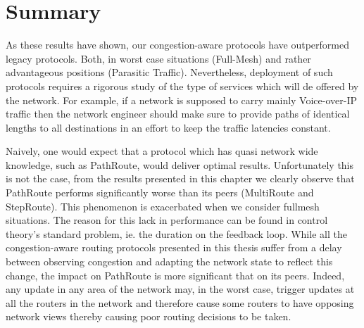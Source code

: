 \section{Summary}

As these results have shown, our congestion-aware protocols have outperformed legacy protocols. Both, in worst case situations (Full-Mesh) and rather advantageous positions (Parasitic Traffic). Nevertheless, deployment of such protocols requires a rigorous study of the type of services which will de offered by the network. For example, if a network is supposed to carry mainly Voice-over-IP traffic then the network engineer should make sure to provide paths of identical lengths to all destinations in an effort to keep the traffic latencies constant. 

Naively, one would expect that a protocol which has quasi network wide knowledge, such as PathRoute, would deliver optimal results. Unfortunately this is not the case, from the results presented in this chapter we clearly observe that PathRoute performs significantly worse than its peers (MultiRoute and StepRoute). This phenomenon is exacerbated when we consider fullmesh situations. The reason for this lack in performance can be found in control theory's standard problem, ie. the duration on the feedback loop. While all the congestion-aware routing protocols presented in this thesis suffer from a delay between observing congestion and adapting the network state to reflect this change, the impact on PathRoute is more significant that on its peers. Indeed, any update in any area of the network may, in the worst case, trigger updates at all the routers in the network and therefore cause some routers to have opposing network views thereby causing poor routing decisions to be taken.

